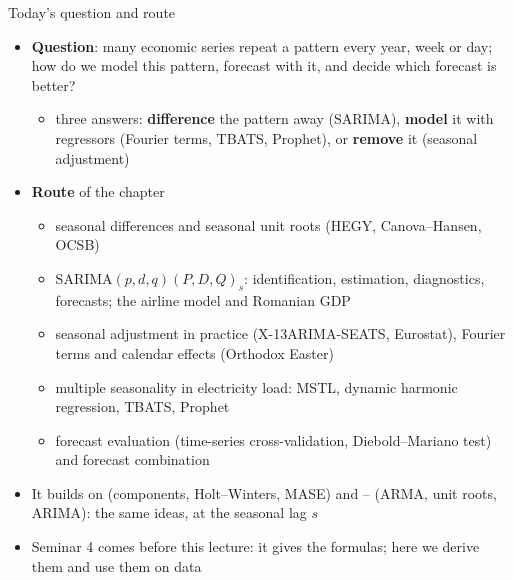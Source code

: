 \begin{frame}{Today's question and route}
\itemsize{\footnotesize}
\begin{itemize}
    \item \textbf{Question}: many economic series repeat a pattern every year, week or day; how do we model this pattern, forecast with it, and decide which forecast is better?
    \begin{itemize}
        \item three answers: \textbf{difference} the pattern away (SARIMA), \textbf{model} it with regressors (Fourier terms, TBATS, Prophet), or \textbf{remove} it (seasonal adjustment)
    \end{itemize}
    \item \textbf{Route} of the chapter
    \begin{itemize}
        \item seasonal differences and seasonal unit roots (HEGY, Canova--Hansen, OCSB)
        \item SARIMA$(p,d,q)(P,D,Q)_s$: identification, estimation, diagnostics, forecasts; the airline model and Romanian GDP
        \item seasonal adjustment in practice (X-13ARIMA-SEATS, Eurostat), Fourier terms and calendar effects (Orthodox Easter)
        \item multiple seasonality in electricity load: MSTL, dynamic harmonic regression, TBATS, Prophet
        \item forecast evaluation (time-series cross-validation, Diebold--Mariano test) and forecast combination
    \end{itemize}
    \item It builds on  (components, Holt--Winters, MASE) and -- (ARMA, unit roots, ARIMA): the same ideas, at the seasonal lag $s$
    \item Seminar 4 comes before this lecture: it gives the formulas; here we derive them and use them on data
\end{itemize}
\end{frame}


